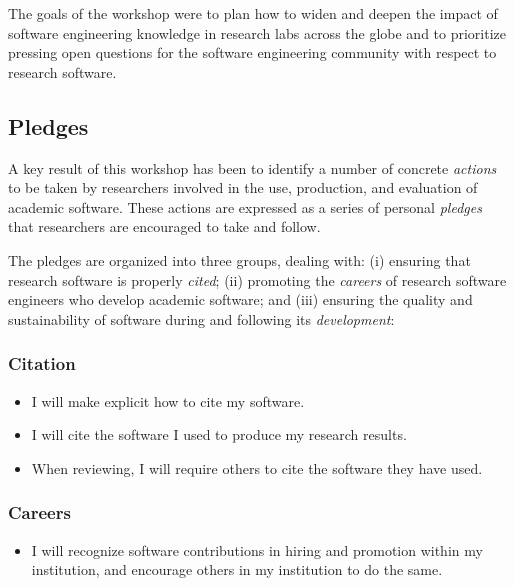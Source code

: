 \documentclass[a4paper,UKenglish]{dagman}
\renewcommand{\paragraph}[1]{\subsubsection*{#1}\xspace}
\begin{document}
The goals of the workshop were to plan how to widen and deepen the impact of software engineering knowledge in research labs across the globe and to prioritize pressing open questions for the software engineering community with respect to research software.

\subsection{Pledges}

A key result of this workshop has been to identify a number of concrete \emph{actions} to be taken by researchers involved in the use, production, and evaluation of academic software. These actions are expressed as a series of personal \emph{pledges} that researchers are encouraged to take and follow.

The pledges are organized into three groups, dealing with:
(i) ensuring that research software is properly \emph{cited};
(ii) promoting the \emph{careers} of research software engineers who develop academic software;
and
(iii) ensuring the quality and sustainability of software during and following its \emph{development}:

\paragraph{Citation}
\begin{itemize}
\item I will make explicit how to cite my software.
\item I will cite the software I used to produce my research results.
\item When reviewing, I will require others to cite the software they have used.
\end{itemize}

\paragraph{Careers}
\begin{itemize}
\item I will recognize software contributions in hiring and promotion within my institution, and encourage others in my institution to do the same.
\end{itemize}
\end{document}
